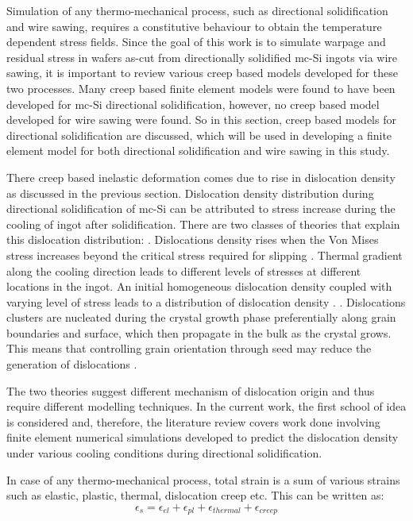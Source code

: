 Simulation of any thermo-mechanical process, such as directional solidification and wire sawing, requires a constitutive behaviour to obtain the temperature dependent stress fields. Since the goal of this work is to simulate warpage and residual stress in wafers as-cut from directionally solidified mc-Si ingots via wire sawing, it is important to review various creep based models developed for these two processes. Many creep based finite element models were found to have been developed for mc-Si directional solidification, however, no creep based model developed for wire sawing were found. So in this section, creep based models for directional solidification are discussed, which will be used in developing a finite element model for both directional solidification and wire sawing in this study.  

There creep based inelastic deformation comes due to rise in dislocation density as discussed in the previous section. Dislocation density distribution during directional solidification of mc-Si can be attributed to stress increase during the cooling of ingot after solidification. There are two classes of theories that explain this dislocation distribution:
. Dislocations density rises when the Von Mises stress increases beyond the critical stress required for slipping \cite{alexander1969dislocations}. Thermal gradient along the cooling direction leads to different levels of stresses at different locations in the ingot. An initial homogeneous dislocation density coupled with varying level of stress leads to a distribution of dislocation density \cite{meese2006thermo,nakano2011numerical}. 
. Dislocations clusters are nucleated during the crystal growth phase preferentially along grain boundaries and surface, which then propagate in the bulk as the crystal grows. This means that controlling grain orientation through seed may reduce the generation of dislocations \cite{takahashi2010generation}. 

\newline
The two theories suggest different mechanism of dislocation origin and thus require different modelling techniques. In the current work, the first school of idea is considered and, therefore, the literature review covers work done involving finite element numerical simulations developed to predict the dislocation density under various cooling conditions during directional solidification.

In case of any thermo-mechanical process, total strain is a sum of various strains such as elastic, plastic, thermal, dislocation creep etc. This can be written as:
\begin{equation}
\epsilon_{s} = \epsilon_{el} + \epsilon_{pl} + \epsilon_{thermal} + \epsilon_{creep}
\label {strainEq}
\end{equation}

